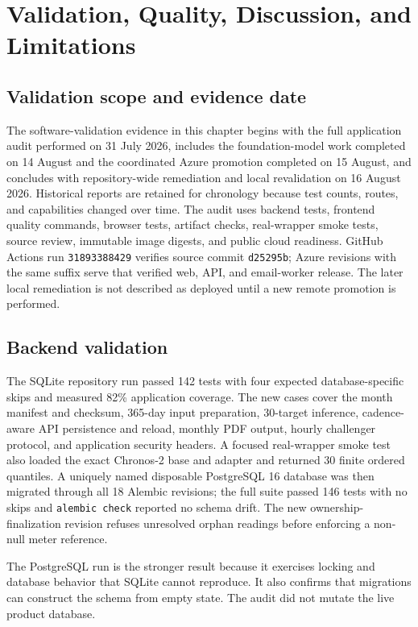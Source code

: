 \chapter{Validation, Quality, Discussion, and Limitations}
\label{chap:validation}

\section{Validation scope and evidence date}

The software-validation evidence in this chapter begins with the full application audit performed on 31 July 2026, includes the foundation-model work completed on 14 August and the coordinated Azure promotion completed on 15 August, and concludes with repository-wide remediation and local revalidation on 16 August 2026. Historical reports are retained for chronology because test counts, routes, and capabilities changed over time. The audit uses backend tests, frontend quality commands, browser tests, artifact checks, real-wrapper smoke tests, source review, immutable image digests, and public cloud readiness. GitHub Actions run \texttt{31893388429} verifies source commit \texttt{d25295b}; Azure revisions with the same suffix serve that verified web, API, and email-worker release. The later local remediation is not described as deployed until a new remote promotion is performed.

\section{Backend validation}

The SQLite repository run passed 142 tests with four expected database-specific skips and measured 82\% application coverage. The new cases cover the month manifest and checksum, 365-day input preparation, 30-target inference, cadence-aware API persistence and reload, monthly PDF output, hourly challenger protocol, and application security headers. A focused real-wrapper smoke test also loaded the exact Chronos-2 base and adapter and returned 30 finite ordered quantiles. A uniquely named disposable PostgreSQL 16 database was then migrated through all 18 Alembic revisions; the full suite passed 146 tests with no skips and \texttt{alembic check} reported no schema drift. The new ownership-finalization revision refuses unresolved orphan readings before enforcing a non-null meter reference.

The PostgreSQL run is the stronger result because it exercises locking and database behavior that SQLite cannot reproduce. It also confirms that migrations can construct the schema from empty state. The audit did not mutate the live product database.

